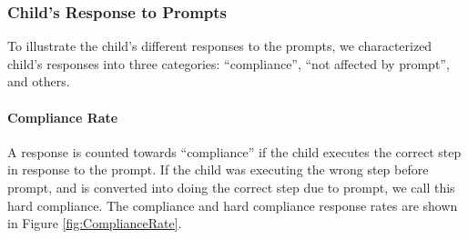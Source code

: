 \documentclass{ut-thesis}
\begin{document}
\subsubsection{Child's Response to Prompts}
To illustrate the child's different responses to the prompts, we characterized child's responses into three categories: ``compliance'', ``not affected by prompt'', and others.

\paragraph{Compliance Rate}
A response is counted towards ``compliance'' if the child executes the correct step in response to the prompt.  If the child was executing the wrong step before prompt, and is converted into doing the correct step due to prompt, we call this hard compliance.  The compliance and hard compliance response rates are shown in Figure \ref{fig:ComplianceRate}.
\end{document}
